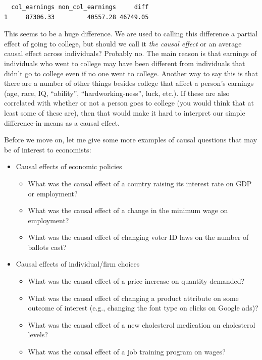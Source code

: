 \documentclass[
  letterpaper,
  DIV=11,
  numbers=noendperiod]{scrreprt}
\begin{document}
\begin{verbatim}
  col_earnings non_col_earnings     diff
1     87306.33         40557.28 46749.05
\end{verbatim}

This seems to be a huge difference. We are used to calling this
difference a partial effect of going to college, but should we call it
\emph{the causal effect} or an average causal effect across individuals?
Probably no. The main reason is that earnings of individuals who went to
college may have been different from individuals that didn't go to
college even if no one went to college. Another way to say this is that
there are a number of other things besides college that affect a
person's earnings (age, race, IQ, ``ability'', ``hardworking-ness'',
luck, etc.). If these are also correlated with whether or not a person
goes to college (you would think that at least some of these are), then
that would make it hard to interpret our simple difference-in-means as a
causal effect.

Before we move on, let me give some more examples of causal questions
that may be of interest to economists:

\begin{itemize}
\item
  Causal effects of economic policies

  \begin{itemize}
  \item
    What was the causal effect of a country raising its interest rate on
    GDP or employment?
  \item
    What was the causal effect of a change in the minimum wage on
    employment?
  \item
    What was the causal effect of changing voter ID laws on the number
    of ballots cast?
  \end{itemize}
\item
  Causal effects of individual/firm choices

  \begin{itemize}
  \item
    What was the causal effect of a price increase on quantity demanded?
  \item
    What was the causal effect of changing a product attribute on some
    outcome of interest (e.g., changing the font type on clicks on
    Google ads)?
  \item
    What was the causal effect of a new cholesterol medication on
    cholesterol levels?
  \item
    What was the causal effect of a job training program on wages?
  \end{itemize}
\end{itemize}
\end{document}

